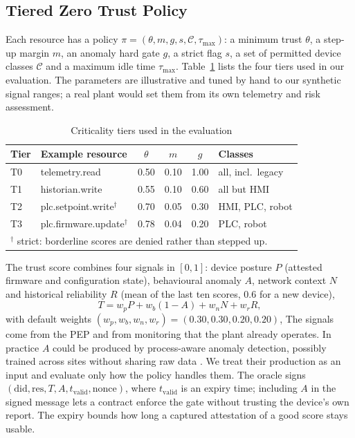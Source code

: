 \subsection{Tiered Zero Trust Policy}\label{sec:tiers}
Each resource has a policy $\pi=(\theta,m,g,s,\mathcal{C},\tau_{\max})$: a minimum trust $\theta$, a step-up margin $m$, an anomaly hard gate $g$, a strict flag $s$, a set of permitted device classes $\mathcal{C}$ and a maximum idle time $\tau_{\max}$. Table~\ref{tab:tiers} lists the four tiers used in our evaluation. The parameters are illustrative and tuned by hand to our synthetic signal ranges; a real plant would set them from its own telemetry and risk assessment.

\begin{table}[t]
\centering
\caption{Criticality tiers used in the evaluation}
\label{tab:tiers}
\scriptsize
\begin{tabular}{@{}llcccl@{}}
\toprule
\textbf{Tier} & \textbf{Example resource} & $\theta$ & $m$ & $g$ & \textbf{Classes} \\
\midrule
T0 & telemetry.read & 0.50 & 0.10 & 1.00 & all, incl.\ legacy \\
T1 & historian.write & 0.55 & 0.10 & 0.60 & all but HMI \\
T2 & plc.setpoint.write$^{\dagger}$ & 0.70 & 0.05 & 0.30 & HMI, PLC, robot \\
T3 & plc.firmware.update$^{\dagger}$ & 0.78 & 0.04 & 0.20 & PLC, robot \\
\bottomrule
\multicolumn{6}{l}{$^{\dagger}$ strict: borderline scores are denied rather than stepped up.}
\end{tabular}
\end{table}

The trust score combines four signals in $[0,1]$: device posture $P$ (attested firmware and configuration state), behavioural anomaly $A$, network context $N$ and historical reliability $R$ (mean of the last ten scores, 0.6 for a new device),
\begin{equation}
T=w_pP+w_b(1-A)+w_nN+w_rR,\label{eq:score}
\end{equation}
with default weights $(w_p,w_b,w_n,w_r)=(0.30,0.30,0.20,0.20)$,
\label{sec:signals}The signals come from the PEP and from monitoring that the plant already operates. In practice $A$ could be produced by process-aware anomaly detection, possibly trained across sites without sharing raw data \cite{tom2025flcti}. We treat their production as an input and evaluate only how the policy handles them. The oracle signs $(\mathrm{did},\mathrm{res},T,A,t_{\mathrm{valid}},\mathrm{nonce})$, where $t_{\mathrm{valid}}$ is an expiry time; including $A$ in the signed message lets a contract enforce the gate without trusting the device's own report. The expiry bounds how long a captured attestation of a good score stays usable.

